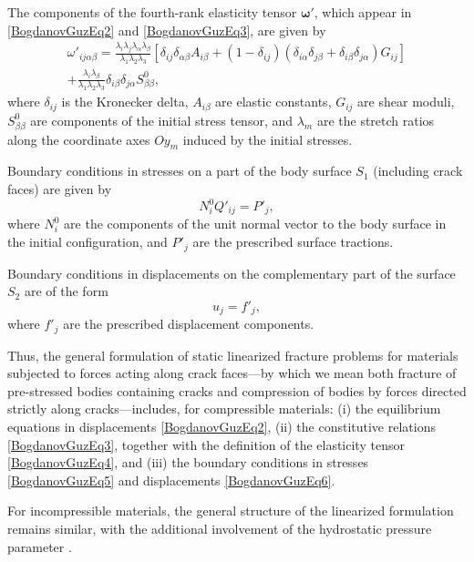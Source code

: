 The components of the fourth-rank elasticity tensor $\boldsymbol{\omega}'$, which appear in \eqref{BogdanovGuzEq2} and \eqref{BogdanovGuzEq3}, are given by
\begin{multline}
	\label{BogdanovGuzEq4}
		\omega'_{ij\alpha\beta}
		=
		\frac{\lambda_i \lambda_j \lambda_\alpha \lambda_\beta}
		{\lambda_1 \lambda_2 \lambda_3}
		\left[
		\delta_{ij}\delta_{\alpha\beta} A_{i\beta}
		+
		(1-\delta_{ij})
		\left(
		\delta_{i\alpha}\delta_{j\beta}
		+
		\delta_{i\beta}\delta_{j\alpha}
		\right)
		G_{ij}
		\right]  \\
		+
		\frac{\lambda_i \lambda_\beta}
		{\lambda_1 \lambda_2 \lambda_3}
		\delta_{i\beta}\delta_{j\alpha}
		S^{0}_{\beta\beta},
\end{multline}
where $\delta_{ij}$ is the Kronecker delta, $A_{i\beta}$ are elastic constants, $G_{ij}$ are shear moduli, $S^{0}_{\beta\beta}$ are components of the initial stress tensor, and $\lambda_m$ are the stretch ratios along the coordinate axes $O y_m$ induced by the initial stresses.

Boundary conditions in stresses on a part of the body surface $S_1$ (including crack faces) are given by
\begin{equation}
	\label{BogdanovGuzEq5}
	N_i^{0} Q'_{ij} = P'_j,
\end{equation}
where $N_i^{0}$ are the components of the unit normal vector to the body surface in the initial configuration, and $P'_j$ are the prescribed surface tractions.

Boundary conditions in displacements on the complementary part of the surface $S_2$ are of the form
\begin{equation}
	\label{BogdanovGuzEq6}
	u_j = f'_j,
\end{equation}
where $f'_j$ are the prescribed displacement components.

Thus, the general formulation of static linearized fracture problems for materials subjected to forces acting along crack faces—by which we mean both fracture of pre-stressed bodies containing cracks and compression of bodies by forces directed strictly along cracks—includes, for compressible materials:
(i) the equilibrium equations in displacements \eqref{BogdanovGuzEq2},  
(ii) the constitutive relations \eqref{BogdanovGuzEq3}, together with the definition of the elasticity tensor \eqref{BogdanovGuzEq4}, and  
(iii) the boundary conditions in stresses \eqref{BogdanovGuzEq5} and displacements \eqref{BogdanovGuzEq6}.

For incompressible materials, the general structure of the linearized formulation remains similar, with the additional involvement of the hydrostatic pressure parameter \cite{BogdanovGuz27,BogdanovGuz31,BogdanovGuz32}.

